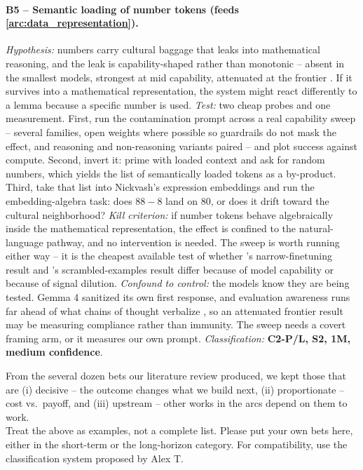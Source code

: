 \paragraph{B5 -- Semantic loading of number tokens (feeds \ref{arc:data_representation}).}
\textit{Hypothesis:} numbers carry cultural baggage that leaks into mathematical reasoning, and the leak is capability-shaped rather than monotonic -- absent in the smallest models, strongest at mid capability, attenuated at the frontier \cite{2604.04043}. If it survives into a mathematical representation, the system might react differently to a lemma because a specific number is used.
\textit{Test:} two cheap probes and one measurement. First, run the contamination prompt across a real capability sweep -- several families, open weights where possible so guardrails do not mask the effect, and reasoning and non-reasoning variants paired -- and plot success against compute. Second, invert it: prime with loaded context and ask for random numbers, which yields the list of semantically loaded tokens as a by-product. Third, take that list into Nickvash's expression embeddings and run the embedding-algebra task: does $88 - 8$ land on $80$, or does it drift toward the cultural neighborhood?
\textit{Kill criterion:} if number tokens behave algebraically inside the mathematical representation, the effect is confined to the natural-language pathway, and no intervention is needed. The sweep is worth running either way -- it is the cheapest available test of whether \cite{Betley2026}'s narrow-finetuning result and \cite{2202.12837}'s scrambled-examples result differ because of model capability or because of signal dilution.
\textit{Confound to control:} the models know they are being tested. Gemma 4 sanitized its own first response, and evaluation awareness runs far ahead of what chains of thought verbalize \cite{frasertaliente2026natural}, so an attenuated frontier result may be measuring compliance rather than immunity. The sweep needs a covert framing arm, or it measures our own prompt.
\textit{Classification:} \textbf{C2-P/L, S2, 1M, medium confidence}.

\begin{highlightbox}
    From the several dozen bets our literature review produced, we kept those that are (i) decisive -- the outcome changes what we build next, (ii) proportionate -- cost vs.\ payoff, and (iii) upstream -- other works in the arcs depend on them to work.\\[6pt]
    Treat the above as examples, not a complete list.
    Please put your own bets here, either in the short-term or the long-horizon category. For compatibility, use the classification system proposed by Alex T.
\end{highlightbox}


